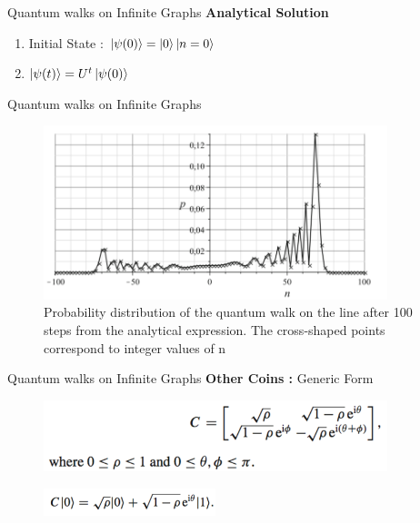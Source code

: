 \documentclass[xcolor=svgnames]{beamer}
\begin{document}
\begin{frame}{Quantum walks on Infinite Graphs}
\textbf{Analytical Solution}
\begin{enumerate}
    \item Initial State :
        $ \ket{\psi(0)} = \ket{0}\ket{n=0}$
    \item $\ket{\psi(t)} = U^{t}\ket{\psi(0)} $
\end{enumerate}
    
\end{frame}

\begin{frame}{Quantum walks on Infinite Graphs}
\begin{figure}
    \centering
    \includegraphics[width = 10cm]{PD_line.png}
    \caption{Probability distribution of the quantum walk on the line after 100 steps from the analytical expression. The cross-shaped points correspond to integer values of n}
\end{figure}
    
\end{frame}

\begin{frame}{Quantum walks on Infinite Graphs}
\textbf{Other Coins : }
Generic Form
\begin{figure}
    \centering
    \includegraphics[width = 10cm]{Coin.png}
\end{figure}
\begin{figure}
    \centering
    \includegraphics[width = 5cm]{Coin2.png}
\end{figure}
    
\end{frame}
\end{document}
